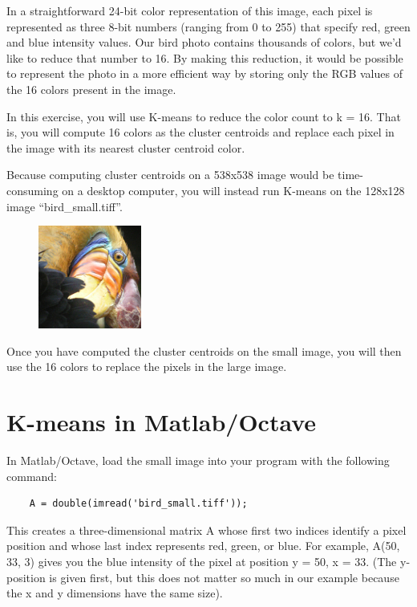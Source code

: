 \documentclass[10pt,a4paper]{article}
\begin{document}
  In a straightforward 24-bit color representation of this image, each pixel is represented as three 8-bit numbers (ranging from 0 to 255) that specify red, green and blue intensity values. Our bird photo contains thousands of colors, but we'd like to reduce that number to 16. By making this reduction, it would be possible to represent the photo in a more efficient way by storing only the RGB values of the 16 colors present in the image.

  In this exercise, you will use K-means to reduce the color count to k = 16. That is, you will compute 16 colors as the cluster centroids and replace each pixel in the image with its nearest cluster centroid color.

  Because computing cluster centroids on a 538x538 image would be time-consuming on a desktop computer, you will instead run K-means on the 128x128 image ``bird\_small.tiff''.
  \begin{figure}[htb!]
    \centering
      \includegraphics[width=.3\columnwidth]{bird_small}
  \end{figure}
  Once you have computed the cluster centroids on the small image, you will then use the 16 colors to replace the pixels in the large image.




\section{K-means in Matlab/Octave}
%
  In Matlab/Octave, load the small image into your program with the following command:
  \begin{lstlisting}
    A = double(imread('bird_small.tiff'));
  \end{lstlisting}

  This creates a three-dimensional matrix A whose first two indices identify a pixel position and whose last index represents red, green, or blue. For example, A(50, 33, 3) gives you the blue intensity of the pixel at position y = 50, x = 33. (The y-position is given first, but this does not matter so much in our example because the x and y dimensions have the same size).
\end{document}
